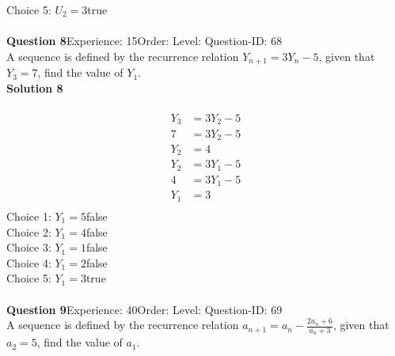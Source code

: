 \documentclass{article}
\begin{document}
Choice 5: \hspace{20pt}$U_2=3$\hspace{20pt}true\\
\\[4pt]
\noindent\textbf{Question 8}\hspace{20pt}Experience: 15\hspace{20pt}Order: \hspace{20pt}Level: \hspace{20pt}Question-ID: 68\\[2pt]
A sequence is defined by the recurrence relation $Y_{n+1}=3Y_n-5$, given that  $Y_3 =7$, find the value of $Y_1$.\\[4pt]
\noindent\textbf{Solution 8}\\[2pt]
\\[-35pt]\begin{align*}
Y_3&=3Y_2-5\\[2pt]
7&=3Y_2-5\\[2pt]
Y_2&=4\\[12pt]
Y_2&=3Y_1-5\\[2pt]
4&=3Y_1-5\\[2pt]
Y_1&=3\\
\end{align*}
Choice 1: \hspace{20pt}$Y_1=5$\hspace{20pt}false\\
Choice 2: \hspace{20pt}$Y_1=4$\hspace{20pt}false\\
Choice 3: \hspace{20pt}$Y_1=1$\hspace{20pt}false\\
Choice 4: \hspace{20pt}$Y_1=2$\hspace{20pt}false\\
Choice 5: \hspace{20pt}$Y_1=3$\hspace{20pt}true\\
\\[4pt]
\noindent\textbf{Question 9}\hspace{20pt}Experience: 40\hspace{20pt}Order: \hspace{20pt}Level: \hspace{20pt}Question-ID: 69\\[2pt]
A sequence is defined by the recurrence relation $a_{n+1}=a_n-\displaystyle\frac{2a_n+6}{a_n+3}$, given that  $a_2 =5$, find the value of $a_1$.\\[4pt]
\end{document}

